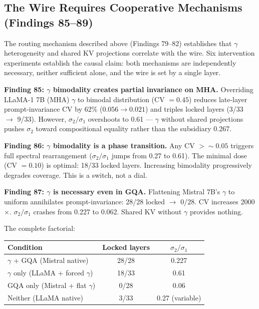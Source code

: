 \documentclass[12pt]{article}
\begin{document}
\subsection{The Wire Requires Cooperative Mechanisms (Findings 85--89)}

The routing mechanism described above (Findings 79--82) establishes that $\gamma$ heterogeneity and shared KV projections correlate with the wire. Six intervention experiments establish the causal claim: both mechanisms are independently necessary, neither sufficient alone, and the wire is set by a single layer.

\textbf{Finding 85: $\gamma$ bimodality creates partial invariance on MHA.} Overriding LLaMA-1 7B (MHA) $\gamma$ to bimodal distribution (CV $= 0.45$) reduces late-layer prompt-invariance CV by 62\% ($0.056 \to 0.021$) and triples locked layers (3/33 $\to$ 9/33). However, $\sigma_2/\sigma_1$ overshoots to 0.61 --- $\gamma$ without shared projections pushes $\sigma_2$ toward compositional equality rather than the subsidiary 0.267.

\textbf{Finding 86: $\gamma$ bimodality is a phase transition.} Any CV $> {\sim}0.05$ triggers full spectral rearrangement ($\sigma_2/\sigma_1$ jumps from 0.27 to 0.61). The minimal dose (CV $= 0.10$) is optimal: 18/33 locked layers. Increasing bimodality progressively degrades coverage. This is a switch, not a dial.

\textbf{Finding 87: $\gamma$ is necessary even in GQA.} Flattening Mistral 7B's $\gamma$ to uniform annihilates prompt-invariance: 28/28 locked $\to$ 0/28. CV increases 2000$\times$. $\sigma_2/\sigma_1$ crashes from 0.227 to 0.062. Shared KV without $\gamma$ provides nothing.

The complete factorial:

\begin{table}[h]
\centering
\begin{tabular}{lcc}
\toprule
\textbf{Condition} & \textbf{Locked layers} & $\sigma_2/\sigma_1$ \\
\midrule
$\gamma$ + GQA (Mistral native) & 28/28 & 0.227 \\
$\gamma$ only (LLaMA + forced $\gamma$) & 18/33 & 0.61 \\
GQA only (Mistral + flat $\gamma$) & 0/28 & 0.06 \\
Neither (LLaMA native) & 3/33 & 0.27 (variable) \\
\bottomrule
\end{tabular}
\end{table}
\end{document}
